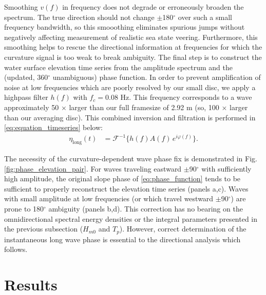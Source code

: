 \documentclass[letterpaper,draftcls,onecolumn]{IEEEtran}
\newcommand{\etalong}{\eta_{\mathrm{long}}}
\begin{document}
\noindent Smoothing $v(f)$ in frequency does not degrade or erroneously broaden the spectrum. The true direction should not change $\pm$180$^{\circ}$ over such a small frequency bandwidth, so this smooothing eliminates spurious jumps without negatively affecting measurement of realistic sea state veering. Furthermore, this smoothing helps to rescue the directional information at frequencies for which the curvature signal is too weak to break ambiguity. The final step is to construct the water surface elevation time series from the amplitude spectrum and the (updated, 360$^{\circ}$ unambiguous) phase function. In order to prevent amplification of noise at low frequencies which are poorly resolved by our small disc, we apply a highpass filter $h(f)$ with $f_c=0.08$ Hz. This frequency corresponds to a wave approximately 50 $\times$ larger than our full framesize of 2.92 m (so, 100 $\times$ larger than our averaging disc). This combined inversion and filtration is performed in \eqref{eq:equation_timeseries} below:
\begin{align}
	\etalong(t) &= \mathcal{F}^{-1}\!\Big\{h(f) A(f)\, e^{i\varphi(f)}\Big\}.
	\label{eq:equation_timeseries}
\end{align}

\vspace{-4pt}

The necessity of the curvature-dependent wave phase fix is demonstrated in Fig. \ref{fig:phase_elevation_pair}. For waves traveling eastward $\pm$90$^{\circ}$ with sufficiently high amplitude, the original slope phase of \eqref{eq:phase_function} tends to be sufficient to properly reconstruct the elevation time series (panels a,c). Waves with small amplitude at low frequencies (or which travel westward $\pm$90$^{\circ}$) are prone to 180$^{\circ}$ ambiguity (panels b,d). This correction has no bearing on the omnidirectional spectral energy densities or the integral parameters presented in the previous subsection ($H_{m0}$ and $T_p$). However, correct determination of the instantaneous long wave phase is essential to the directional analysis which follows.

\vspace{-10pt}

\section{Results}
\label{sec:results}

\vspace{-1pt}
\end{document}
